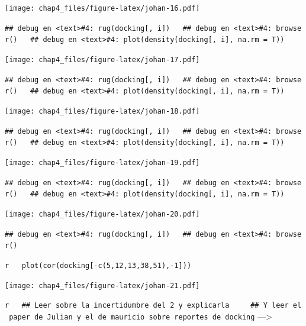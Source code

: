 \documentclass[]{article}
\begin{document}
{\texttt{[image: chap4\_files/figure-latex/johan-16.pdf]}

\texttt{\#\#\ debug\ en\ \textless{}text\textgreater{}\#4:\ rug(docking{[},\ i{]})\ \ \ \#\#\ debug\ en\ \textless{}text\textgreater{}\#4:\ browser()\ \ \ \#\#\ debug\ en\ \textless{}text\textgreater{}\#4:\ plot(density(docking{[},\ i{]},\ na.rm\ =\ T))}

\texttt{[image: chap4\_files/figure-latex/johan-17.pdf]}

\texttt{\#\#\ debug\ en\ \textless{}text\textgreater{}\#4:\ rug(docking{[},\ i{]})\ \ \ \#\#\ debug\ en\ \textless{}text\textgreater{}\#4:\ browser()\ \ \ \#\#\ debug\ en\ \textless{}text\textgreater{}\#4:\ plot(density(docking{[},\ i{]},\ na.rm\ =\ T))}

\texttt{[image: chap4\_files/figure-latex/johan-18.pdf]}

\texttt{\#\#\ debug\ en\ \textless{}text\textgreater{}\#4:\ rug(docking{[},\ i{]})\ \ \ \#\#\ debug\ en\ \textless{}text\textgreater{}\#4:\ browser()\ \ \ \#\#\ debug\ en\ \textless{}text\textgreater{}\#4:\ plot(density(docking{[},\ i{]},\ na.rm\ =\ T))}

\texttt{[image: chap4\_files/figure-latex/johan-19.pdf]}

\texttt{\#\#\ debug\ en\ \textless{}text\textgreater{}\#4:\ rug(docking{[},\ i{]})\ \ \ \#\#\ debug\ en\ \textless{}text\textgreater{}\#4:\ browser()\ \ \ \#\#\ debug\ en\ \textless{}text\textgreater{}\#4:\ plot(density(docking{[},\ i{]},\ na.rm\ =\ T))}

\texttt{[image: chap4\_files/figure-latex/johan-20.pdf]}

\texttt{\#\#\ debug\ en\ \textless{}text\textgreater{}\#4:\ rug(docking{[},\ i{]})\ \ \ \#\#\ debug\ en\ \textless{}text\textgreater{}\#4:\ browser()}

\texttt{r\ \ \ plot(cor(docking{[}-c(5,12,13,38,51),-1{]}))}

\texttt{[image: chap4\_files/figure-latex/johan-21.pdf]}

\texttt{r\ \ \ \#\#\ Leer\ sobre\ la\ incertidumbre\ del\ 2\ y\ explicarla\ \ \ \ \ \#\#\ Y\ leer\ el\ paper\ de\ Julian\ y\ el\ de\ mauricio\ sobre\ reportes\ de\ docking}
---\textgreater{}

}
\end{document}
